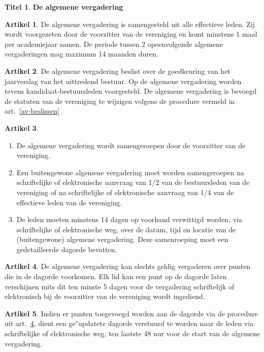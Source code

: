 \documentclass[a4paper,10pt]{article}
\theoremstyle{definition}
\newtheorem{titel}{\newline\Large Titel}
\newtheorem{artikel}{\large Artikel}
\newcommand{\ttext}[1]{\Large \textbf{#1} \normalsize}
\newcommand{\ttextcr}{\hfill\newline}
\newcommand{\ttextenum}{\mbox{}}
\begin{document}
\begin{titel}\ttext{De algemene vergadering}

  \begin{artikel}\ttextcr
    De algemene vergadering is samengesteld uit alle effectieve leden.
    Zij wordt voorgezeten door de voorzitter van de vereniging en komt minstens 1 maal per academiejaar samen.
    De periode tussen 2 opeenvolgende algemene vergaderingen mag maximum 14 maanden duren.
  \end{artikel}

  \begin{artikel}\ttextcr
    De algemene vergadering beslist over de goedkeuring van het jaarverslag van het uittredend bestuur.
    Op de algemene vergadering worden tevens kandidaat-bestuursleden voorgesteld.
    De algemene vergadering is bevoegd de statuten van de vereniging te wijzigen volgens de procedure vermeld in art.~\ref{av-beslissen}
  \end{artikel}

  \begin{artikel}\label{av-samenroeping}\ttextenum
    \begin{enumerate}
      \item
        De algemene vergadering wordt samengeroepen door de voorzitter van de vereniging.
      \item
        Een buitengewone algemene vergadering moet worden samengeroepen na schriftelijke of elektronische aanvraag van 1/2 van de bestuursleden van de vereniging of na schriftelijke of elektronische aanvraag van 1/4 van de effectieve leden van de vereniging.
      \item
        De leden moeten minstens 14 dagen op voorhand verwittigd worden, via schriftelijke of elektronische weg, over de datum, tijd en locatie van de (buitengewone) algemene vergadering.
        Deze samenroeping moet een gedetailleerde dagorde bevatten.
    \end{enumerate}
  \end{artikel}

  \begin{artikel}\label{av-dagorde}\ttextcr
    De algemene vergadering kan slechts geldig vergaderen over punten die in de dagorde voorkomen.
    Elk lid kan een punt op de dagorde laten verschijnen mits dit ten minste 5 dagen voor de vergadering schriftelijk of elektronisch bij de voorzitter van de vereniging wordt ingediend.
  \end{artikel}

  \begin{artikel}\ttextcr
    Indien er punten toegevoegd worden aan de dagorde via de procedure uit art.~\ref{av-dagorde}, dient een ge"updatete dagorde verstuurd te worden naar de leden via schriftelijke of elektronische weg, ten laatste 48 uur voor de start van de algemene vergadering.
  \end{artikel}


\end{titel}
\end{document}
